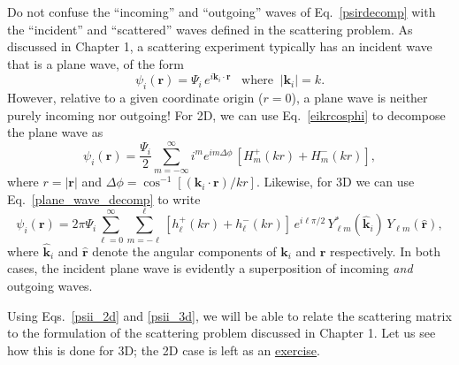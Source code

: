 \documentclass[pra,12pt]{revtex4}
\begin{document}
Do not confuse the ``incoming'' and ``outgoing'' waves of
Eq.~\eqref{psirdecomp} with the ``incident'' and ``scattered'' waves
defined in the scattering problem.  As discussed in Chapter 1, a
scattering experiment typically has an incident wave that is a plane
wave, of the form
\begin{equation}
  \psi_i(\mathbf{r}) = \Psi_i \, e^{i\mathbf{k}_i\cdot\mathbf{r}} \;\;\;
  \mathrm{where}\;\; |\mathbf{k}_i| = k.
\end{equation}
However, relative to a given coordinate origin ($r = 0$), a plane wave
is neither purely incoming nor outgoing!  For 2D, we can use
Eq.~\eqref{eikrcosphi} to decompose the plane wave as
\begin{equation}
  \psi_i(\mathbf{r})
  = \frac{\Psi_i}{2} \sum_{m=-\infty}^\infty i^m e^{im \Delta\phi} \,
  \left[H_m^+(kr) + H_m^-(kr)\right],
  \label{psii_2d}
\end{equation}
where $r = |\mathbf{r}|$ and $\Delta \phi =
\cos^{-1}\left[(\mathbf{k}_i\!\cdot\!\mathbf{r})/kr\right]$.
Likewise, for 3D we can use Eq.~\eqref{plane_wave_decomp} to write
\begin{equation}
  \psi_i(\mathbf{r})
  = 2\pi \Psi_i \sum_{\ell=0}^\infty \sum_{m=-\ell}^\ell
  \left[h_{\ell}^+(kr) + h_{\ell}^-(kr) \right] \, e^{i\ell\pi/2} \,
  Y_{\ell m}^*(\hat{\mathbf{k}}_i) \, Y_{\ell m}(\hat{\mathbf{r}}),
  \label{psii_3d}
\end{equation}
where $\hat{\mathbf{k}}_i$ and $\hat{\mathbf{r}}$ denote the angular
components of $\mathbf{k}_i$ and $\mathbf{r}$ respectively.  In both
cases, the incident plane wave is evidently a superposition of
incoming \textit{and} outgoing waves.

Using Eqs.~\eqref{psii_2d} and \eqref{psii_3d}, we will be able to
relate the scattering matrix to the formulation of the scattering
problem discussed in Chapter 1.  Let us see how this is done for 3D;
the 2D case is left as an \hyperref[ex:2dscattering]{exercise}.
\end{document}
